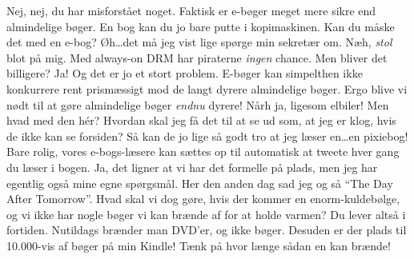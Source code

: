 \documentclass[a4paper,11pt]{article}
\begin{document}
\begin{sketch}
     Nej, nej, du har misforstået noget.
     Faktisk er e-bøger meget mere sikre
             end almindelige bøger. En bog kan du jo bare putte i kopimaskinen. Kan
             du måske det med en e-bog?
     
             Øh\ldots det må jeg vist lige spørge min sekretær om.
      Næh, \emph{stol} blot på mig.
             Med always-on DRM har piraterne \emph{ingen} chance.
     Men bliver det billigere?
     Ja! Og det er jo et stort problem. E-bøger kan simpelthen ikke konkurrere
             rent prismæssigt mod de langt dyrere almindelige bøger.
     Ergo blive vi nødt til at gøre almindelige bøger \emph{endnu} dyrere!
     Nårh ja, ligesom elbiler!
     Men hvad med den hér? 
     Hvordan skal jeg få det til at se ud som, at jeg er klog, hvis de ikke kan se forsiden?
             Så kan de jo lige så godt tro at jeg læser en\ldots en pixiebog!
     Bare rolig, vores e-bogs-læsere kan sættes op til automatisk at tweete hver
             gang du læser i bogen.
     Ja, det ligner at vi har det formelle på plads, men jeg har egentlig også mine
             egne spørgsmål. 
     Her den anden dag sad jeg og så ``The Day After Tomorrow''.
             Hvad skal vi dog gøre, hvis der kommer en enorm-kuldebølge, og vi ikke
             har nogle bøger vi kan brænde af for at holde varmen?
     Du lever altså i fortiden. Nutildags brænder man DVD'er, og ikke bøger.
             Desuden er der plads til 10.000-vis af bøger på min Kindle!
             Tænk på hvor længe sådan en kan brænde!

\end{sketch}
\end{document}
